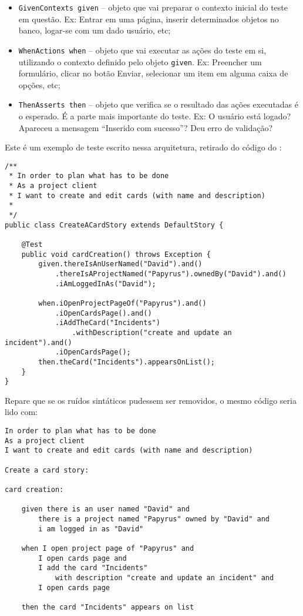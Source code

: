 \begin{itemize}
	\item{\texttt{GivenContexts given} -- objeto que vai preparar o contexto inicial do teste em questão. Ex: Entrar em uma página, inserir determinados objetos no banco, logar-se com um dado usuário, etc;}
	\item{\texttt{WhenActions when} -- objeto que vai executar as ações do teste em si, utilizando o contexto definido pelo objeto \texttt{given}. Ex: Preencher um formulário, clicar no botão Enviar, selecionar um item em alguma caixa de opções, etc;}
	\item{\texttt{ThenAsserts then} -- objeto que verifica se o resultado das ações executadas é o esperado. É a parte mais importante do teste. Ex: O usuário está logado? Apareceu a mensagem ``Inserido com sucesso''? Deu erro de validação?}
\end{itemize}

Este é um exemplo de teste escrito nessa arquitetura, retirado do código do \calopsita{}:

\begin{lstlisting}
/**
 * In order to plan what has to be done
 * As a project client
 * I want to create and edit cards (with name and description)
 *
 */
public class CreateACardStory extends DefaultStory {

	@Test
	public void cardCreation() throws Exception {
		given.thereIsAnUserNamed("David").and()
			.thereIsAProjectNamed("Papyrus").ownedBy("David").and()
			.iAmLoggedInAs("David");

		when.iOpenProjectPageOf("Papyrus").and()
		    .iOpenCardsPage().and()
			.iAddTheCard("Incidents")
				.withDescription("create and update an incident").and()
			.iOpenCardsPage();
		then.theCard("Incidents").appearsOnList();
	}
}
\end{lstlisting}

Repare que se os ruídos sintáticos pudessem ser removidos, o mesmo código seria lido com:

\begin{verbatim}
In order to plan what has to be done
As a project client
I want to create and edit cards (with name and description)

Create a card story:

card creation:
	
	given there is an user named "David" and
		there is a project named "Papyrus" owned by "David" and
		i am logged in as "David"

	when I open project page of "Papyrus" and
		I open cards page and
		I add the card "Incidents" 
			with description "create and update an incident" and
		I open cards page
			
	then the card "Incidents" appears on list
\end{verbatim}

